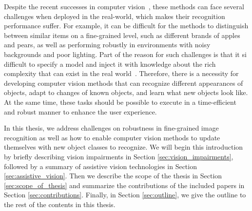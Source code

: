 Despite the recent successes in computer vision~\cite{he2016deep, redmon2017yolo9000, xu2015show}, these methods can face several challenges when deployed in the real-world, which makes their recognition performance suffer. For example, it can be difficult for the methods to distinguish between similar items on a fine-grained level, such as different brands of apples and pears, as well as performing robustly in environments with noisy backgrounds and poor lighting. 
Part of the reason for such challenges is that it si difficult to specify a model and inject it with knowledge about the rich complexity that can exist in the real world~\cite{szeliski2010computer}.
Therefore, there is a necessity for developing computer vision methods that can recognize different appearances of objects, adapt to changes of known objects, and learn what new objects look like. 
At the same time, these tasks should be possible to execute in a time-efficient and robust manner 
to enhance the user experience. 

In this thesis, we address %
challenges on robustness in fine-grained image recognition %
as well as how to enable computer vision methods to update themselves with new object classes to recognize. %
We will begin this introduction by briefly describing vision impairments in Section \ref{sec:vision_impairments}, followed by a summary of assistive vision technologies in Section \ref{sec:assistive_vision}. Then we describe the scope of the thesis in Section \ref{sec:scope_of_thesis} and summarize the contributions of the included papers in Section \ref{sec:contributions}. Finally, in Section \ref{sec:outline}, we give the outline to the rest of the contents in this thesis. 


